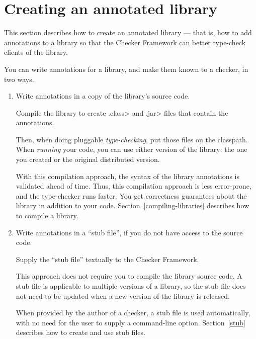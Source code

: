 \section{Creating an annotated library\label{annotated-libraries-creating}}

This section describes how to create an annotated library --- that is, how
to add annotations to a library so that the Checker Framework can better
type-check clients of the library.

You can write annotations for a library, and make them known to a checker, in two ways.

\begin{enumerate}
\item
  Write annotations in a copy of the library's source code.

  Compile the library to create \<.class> and \<.jar> files that
  contain the annotations.

  Then, when doing pluggable \emph{type-checking},
  put those files on the classpath.
  When \emph{running} your code, you can use either version of the library:  the
  one you created or the original distributed version.


  With this compilation approach, the syntax of the library annotations is
  validated ahead of time.  Thus, this compilation approach is less
  error-prone, and the type-checker runs faster.  You get
  correctness guarantees about the library in addition to your code.
  Section~\ref{compiling-libraries} describes how to compile a library.

\item
  Write annotations in a ``stub file'', if you do not have access to the
  source code.

  Supply the ``stub file'' textually to the Checker Framework.

  This approach does not require you to compile the library source
  code.
  A stub file is applicable to multiple versions of a library, so
  the stub file does not need to be updated when a new version of the
  library is released.

  When provided by the author of a checker, a stub file is used
  automatically, with no need for the user to supply a command-line option.
  Section~\ref{stub} describes how to create and use stub files.

\end{enumerate}


